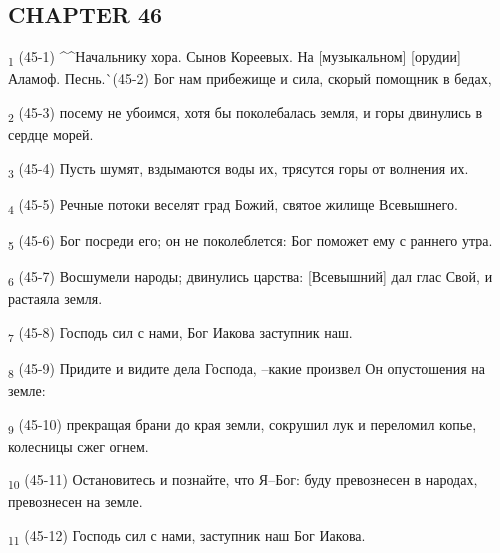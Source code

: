 \subsection{CHAPTER 46}
\begin{tcolorbox}
\textsubscript{1} (45-1) ^^Начальнику хора. Сынов Кореевых. На [музыкальном] [орудии] Аламоф. Песнь.^^ (45-2) Бог нам прибежище и сила, скорый помощник в бедах,
\end{tcolorbox}
\begin{tcolorbox}
\textsubscript{2} (45-3) посему не убоимся, хотя бы поколебалась земля, и горы двинулись в сердце морей.
\end{tcolorbox}
\begin{tcolorbox}
\textsubscript{3} (45-4) Пусть шумят, вздымаются воды их, трясутся горы от волнения их.
\end{tcolorbox}
\begin{tcolorbox}
\textsubscript{4} (45-5) Речные потоки веселят град Божий, святое жилище Всевышнего.
\end{tcolorbox}
\begin{tcolorbox}
\textsubscript{5} (45-6) Бог посреди его; он не поколеблется: Бог поможет ему с раннего утра.
\end{tcolorbox}
\begin{tcolorbox}
\textsubscript{6} (45-7) Восшумели народы; двинулись царства: [Всевышний] дал глас Свой, и растаяла земля.
\end{tcolorbox}
\begin{tcolorbox}
\textsubscript{7} (45-8) Господь сил с нами, Бог Иакова заступник наш.
\end{tcolorbox}
\begin{tcolorbox}
\textsubscript{8} (45-9) Придите и видите дела Господа, --какие произвел Он опустошения на земле:
\end{tcolorbox}
\begin{tcolorbox}
\textsubscript{9} (45-10) прекращая брани до края земли, сокрушил лук и переломил копье, колесницы сжег огнем.
\end{tcolorbox}
\begin{tcolorbox}
\textsubscript{10} (45-11) Остановитесь и познайте, что Я--Бог: буду превознесен в народах, превознесен на земле.
\end{tcolorbox}
\begin{tcolorbox}
\textsubscript{11} (45-12) Господь сил с нами, заступник наш Бог Иакова.
\end{tcolorbox}

